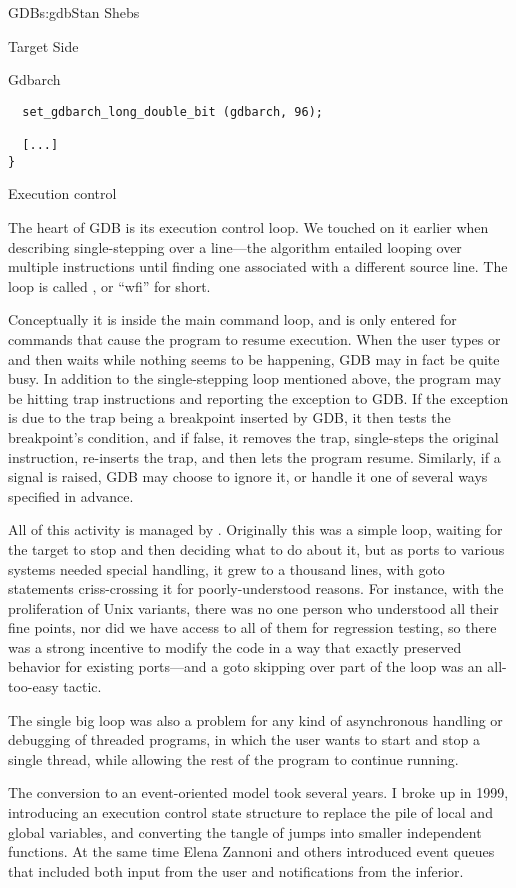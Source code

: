 \begin{aosachapter}{GDB}{s:gdb}{Stan Shebs}
\begin{aosasect1}{Target Side}
\begin{aosasect2}{Gdbarch}
\begin{verbatim}
  set_gdbarch_long_double_bit (gdbarch, 96);

  [...]
}
\end{verbatim}

\end{aosasect2}

\begin{aosasect2}{Execution control}

The heart of GDB is its execution control loop.  We touched on it
earlier when describing single-stepping over a line---the algorithm
entailed looping over multiple instructions until finding one
associated with a different source line.  The loop is called , or ``wfi'' for short.

Conceptually it is inside the main command loop, and is only entered
for commands that cause the program to resume execution.  When the
user types  or  and then waits while nothing
seems to be happening, GDB may in fact be quite busy.  In addition to
the single-stepping loop mentioned above, the program may be hitting
trap instructions and reporting the exception to GDB.  If the
exception is due to the trap being a breakpoint inserted by GDB, it
then tests the breakpoint's condition, and if false, it removes the
trap, single-steps the original instruction, re-inserts the trap, and
then lets the program resume.  Similarly, if a signal is raised, GDB
may choose to ignore it, or handle it one of several ways specified in
advance.

All of this activity is managed by .
Originally this was a simple loop, waiting for the target to stop and
then deciding what to do about it, but as ports to various systems
needed special handling, it grew to a thousand lines, with goto
statements criss-crossing it for poorly-understood reasons.  For
instance, with the proliferation of Unix variants, there was no one
person who understood all their fine points, nor did we have access to
all of them for regression testing, so there was a strong incentive to
modify the code in a way that exactly preserved behavior for existing
ports---and a goto skipping over part of the loop was an all-too-easy
tactic.

The single big loop was also a problem for any kind of asynchronous
handling or debugging of threaded programs, in which the user wants to
start and stop a single thread, while allowing the rest of the program
to continue running.

The conversion to an event-oriented model took several years.  I broke
up  in 1999, introducing an execution
control state structure to replace the pile of local and global
variables, and converting the tangle of jumps into smaller independent
functions.  At the same time Elena Zannoni and others introduced event
queues that included both input from the user and notifications from
the inferior.


\end{aosasect2}
\end{aosasect1}
\end{aosachapter}
